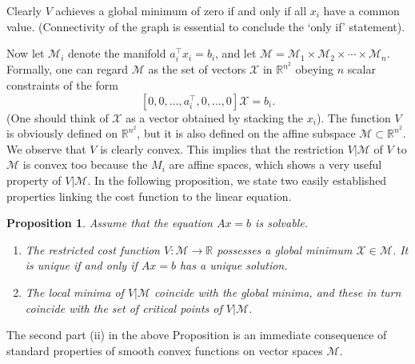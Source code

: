 \documentclass{aims}
\newtheorem{prop}{\textbf{Proposition}}
\begin{document}
Clearly $V$ achieves a global minimum of zero if and only if all $x_i$ have a common value. (Connectivity of the graph is essential to conclude the `only if' statement).

Now let $\mathcal M_i$ denote the manifold $a_i^{\top}x_i=b_i$, and
let $\mathcal M=\mathcal M_1\times \mathcal
  M_2\times\cdots\times \mathcal M_n$. Formally, one can regard $\mathcal M$
as the set of vectors $\mathcal X$ in  $\mathbb
  R^{n^2}$ obeying $n$ scalar constraints of the form
$$[0,0,\ldots,a_i^{\top},0,\ldots,0]\mathcal X=b_i.$$ (One should think of $\mathcal X$ as a vector obtained by stacking the $x_i$).
The function $V$ is obviously defined on $\mathbb R^{n^2}$, but it is
also defined on the affine subspace $\mathcal M \subset
  \mathbb R^{n^2}$. We observe that $V$ is clearly
  convex. This implies that the restriction $V|{\mathcal M}$ of $V$
  to  $\mathcal M$ is convex too because the $M_i$ are affine spaces, which shows a very useful property
  of $V|{\mathcal M}$. In the following proposition, we state two easily established properties linking the cost function to the linear equation.

\begin{prop} Assume that the equation $Ax=b$ is
  solvable. \begin{enumerate}
\item[(i)] The restricted cost function $V:{\mathcal M}\to \mathbb
  R$ possesses a global minimum $\mathcal X \in \mathcal M$. It is
  unique if and only if $Ax=b$ has a unique solution.
\item[(ii)] The local
  minima of $V|{\mathcal M}$ coincide with the global minima, and
  these in turn coincide with the set of critical points of
  $V|{\mathcal M}$.
\end{enumerate}
\end{prop}

The second part (ii) in the above Proposition is an immediate consequence of standard properties of smooth
convex functions on vector spaces $\mathcal M$.
\end{document}
